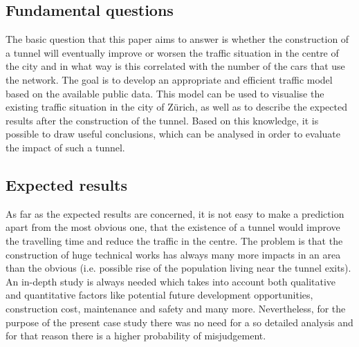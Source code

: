 \documentclass[11pt]{article}
\begin{document}
\subsection{Fundamental questions} %
\label{sub:fundamental_questions}
The basic question that this paper aims to answer is whether the construction of a tunnel will eventually improve or worsen the traffic situation in the centre of the city and in what way is this correlated with the number of the cars that use the network. The goal is to develop an appropriate and efficient traffic model based on the available public data. This model can be used to visualise the existing traffic situation in the city of Z\"urich, as well as to describe the expected results after the construction of the tunnel. Based on this knowledge, it is possible to draw useful conclusions, which can be analysed in order to evaluate the impact of such a tunnel.

\subsection{Expected results} %
\label{sub:expected_results}
As far as the expected results are concerned, it is not easy to make a prediction apart from the most obvious one, that the existence of a tunnel would improve the travelling time and reduce the traffic in the centre. The problem is that the construction of huge technical works has always many more impacts in an area than the obvious (i.e. possible rise of the population living near the tunnel exits). An in-depth study is always needed which takes into account both qualitative and quantitative factors like potential future development opportunities, construction cost, maintenance and safety and many more. Nevertheless, for the purpose of the present case study there was no need for a so detailed analysis and for that reason there is a higher probability of misjudgement.
\end{document}
